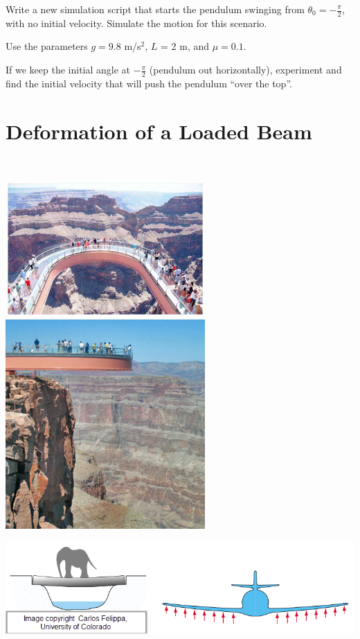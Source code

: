 \problem Write a new simulation script that starts the pendulum
swinging from $ \theta_0 = -\frac{\pi}{2}$, with no initial velocity.
Simulate the motion for this scenario.

Use the  parameters $g = 9.8$ m/s$^2$, $L$ = 2 m, and $\mu = 0.1$. \\

\vsc

\newpage

\problem If we keep the initial angle at $-\frac{\pi}{2}$ (pendulum
out horizontally), experiment and find the initial velocity that will
push the pendulum ``over the top''.

\newpage

\section*{Deformation of a Loaded Beam} 
~\\[1ex]

\begin{minipage}{3.2in}
\includegraphics[width=3in]{graphics/notes_09_GrandCanyonWalkway} \\
\includegraphics[width=3in]{graphics/notes_09_GrandCanyon_SkywalkFromOutsideLedge}
\end{minipage}
\begin{minipage}{4in}
\includegraphics[width=7in]{graphics/notes_09_BeamExamples_CarlosFelippa} \\
\end{minipage}

